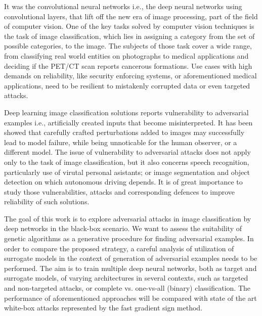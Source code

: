 It was the convolutional neural networks i.e., the deep neural networks using convolutional layers, that lift off the new era of image processing, part of the field of computer vision. One of the key tasks solved by computer vision techniques is the task of image classification, which lies in assigning a category from the set of possible categories, to the image. The subjects of those task cover a wide range, from classifying real world entities on photographs to medical applications and deciding if the PET/CT scan reports cancerous formations. Use cases with high demands on reliability, like security enforcing systems, or aforementioned medical applications, need to be resilient to mistakenly corrupted data or even targeted attacks.

Deep learning image classification solutions reports vulnerability to adversarial examples i.e., artificially created inputs that become misinterpreted. It has been showed that carefully crafted perturbations added to images may successfully lead to model failure, while being unnoticable for the human observer, or a different model. The issue of vulnerability to adversarial attacks does not apply only to the task of image classification, but it also concerns speech recognition, particularly use of virutal personal asistants; or image segmentation and object detection on which autonomous driving depends. It is of great importance to study those vulnerabilities, attacks and corresponding defences to improve reliability of such solutions.


The goal of this work is to explore adversarial attacks in image classification by deep networks in the black-box scenario. We want to assess the suitability of genetic algorithms as a generative procedure for finding adversarial examples. In order to compare the proposed strategy, a careful analysis of utilization of surrogate models in the context of generation of adversarial examples needs to be performed. The aim is to train multiple deep neural networks, both as target and surrogate models, of varying architectures in several contexts, such as targeted and non-targeted attacks, or complete vs. one-vs-all (binary) classification. The performance of aforementioned approaches will be compared with state of the art white-box attacks represented by the fast gradient sign method.

